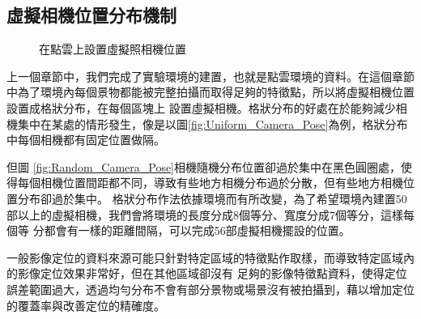 \subsection{虛擬相機位置分布機制}

	\begin{figure}
		\begin{center}
		\end{center}
	  \caption{在點雲上設置虛擬照相機位置}
	  \label{fig:Virtual Camera Pose}	
	\end{figure}	
	
	上一個章節中，我們完成了實驗環境的建置，也就是點雲環境的資料。在這個章節中為了環境內每個景物都能被完整拍攝而取得足夠的特徵點，所以將虛擬相機位置設置成格狀分布，在每個區塊上
	設置虛擬相機。格狀分布的好處在於能夠減少相機集中在某處的情形發生，像是以圖\ref{fig:Uniform_Camera_Pose}為例，格狀分布中每個相機都有固定位置做隔。
	
	但圖	\ref{fig:Random_Camera_Pose}相機隨機分布位置卻過於集中在黑色圓圈處，使得每個相機位置間距都不同，導致有些地方相機分布過於分散，但有些地方相機位置分布卻過於集中。
	格狀分布作法依據環境而有所改變，為了希望環境內建置50部以上的虛擬相機，我們會將環境的長度分成8個等分、寬度分成7個等分，這樣每個等
	分都會有一樣的距離間隔，可以完成56部虛擬相機擺設的位置。
	
	一般影像定位的資料來源可能只針對特定區域的特徵點作取樣，而導致特定區域內的影像定位效果非常好，但在其他區域卻沒有
	足夠的影像特徵點資料，使得定位誤差範圍過大，透過均勻分布不會有部分景物或場景沒有被拍攝到，藉以增加定位的覆蓋率與改善定位的精確度。
	
